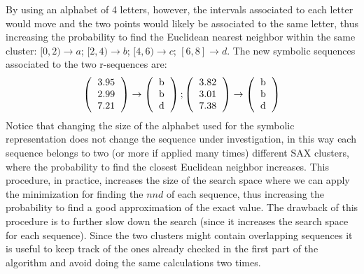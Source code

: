 \documentclass[a4paper,twoside]{article}
\begin{document}
By using an alphabet of 4 letters, however, the intervals associated to each letter would move and the two points would likely be associated to the same letter, thus increasing the probability to find the Euclidean nearest neighbor within the same cluster:
$[0, 2) \longrightarrow a $; $[2, 4) \longrightarrow b $; $[4, 6) \longrightarrow c $; $[6, 8] \longrightarrow d $.
%
%
The new symbolic sequences associated to the two r-sequences are:
\begin{equation}
 \left(
   \begin{tabular}{c}
       3.95 \\
       2.99 \\
       7.21
   \end{tabular}
 \right)
 \rightarrow
  \left(
   \begin{tabular}{c}
       b \\
       b \\
       d
   \end{tabular}
 \right)
 ;
 \left(
   \begin{tabular}{c}
       3.82 \\
       3.01 \\
       7.38
   \end{tabular}
 \right)
 \rightarrow
  \left(
   \begin{tabular}{c}
       b \\
       b \\
       d 
   \end{tabular}
 \right)
\end{equation}
%
Notice that changing the size of the alphabet used for the symbolic representation does not change the sequence under investigation, in this way each sequence belongs to two (or more if applied many times) different SAX clusters, where the probability to find the closest Euclidean neighbor increases.
This procedure, in practice, increases the size of the search space where we can apply the minimization for finding the $nnd$ of each sequence, thus increasing the probability to find a good approximation of the exact value.
%
The drawback of this procedure is to further slow down the search (since it increases the search space for each sequence). Since the two clusters might contain overlapping sequences it is useful to keep track of the ones already checked in the first part of the algorithm and avoid doing the same calculations two times. 
\end{document}
